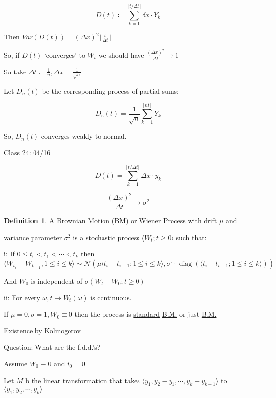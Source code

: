 \documentclass{article}
\theoremstyle{definition}
\newtheorem{definition}{Definition}
\begin{document}
\[
    D(t) \coloneqq \sum_{k=1}^{\lfloor t / \Delta t \rfloor} \delta x \cdot Y_k
\]

Then \(Var(D(t))=(\Delta x)^2 \lfloor \frac{t}{\Delta t} \rfloor\) 

So, if \(D(t)\) `converges' to \(W_t\) we should have \(\frac{(\Delta x)^2}{\Delta t} \to 1\) 

So take \(\Delta t \coloneqq \frac{1}{n}, \Delta x = \frac{1}{\sqrt{n} }\) 

Let \(D_n(t)\) be the corresponding process of partial sums:

\[
    D_n(t) = \frac{1}{\sqrt{n} } \sum_{k=1}^{\lfloor n t \rfloor} Y_k 
\]

So, \(D_n(t)\) converges weakly to normal.

\hrulefill

Class 24: 04/16

\[
    D(t) = \sum_{k=1}^{\lfloor t / \Delta t \rfloor} \Delta x\cdot y_k
\]

\[
    \frac{(\Delta x)^2}{\Delta t} \to \sigma ^2
\]

\begin{definition}
    A \underline{Brownian Motion} (BM) or \underline{Wiener Process} with \underline{drift} \(\mu\) and
    
    \underline{variance parameter} \(\sigma^2\) is a stochastic process \(\langle W_t; t\geq 0 \rangle \) such that:
    
    i: If \(0 \leq t_0 < t_1 < \cdots < t_k\) then \(\langle W_{t_i} - W_{t_{i-1}}, 1 \leq i \leq k \rangle \sim \mathcal{N}(\mu \langle t_i - t_{i-1}; 1 \leq i \leq k \rangle, \sigma^2 \cdot \operatorname{diag}(\langle t_i - t_{i-1}; 1 \leq i \leq k \rangle )  ) \)  

    And \(W_0\) is independent of \(\sigma(W_t - W_0; t\geq 0)\) 

    ii: For every \(\omega, t \mapsto W_t(\omega)\) is continuous.
    
    If \(\mu = 0, \sigma = 1, W_0 \equiv 0\) then the process is \underline{standard} \underline{B.M.} or just \underline{B.M.} 
\end{definition}

Existence by Kolmogorov

Question: What are the f.d.d.'s?

Assume \(W_0 \equiv 0\) and \(t_0 = 0\) 

Let \(M\) b the linear transformation that takes \(\langle y_1, y_2 - y_1, \cdots, y_k - y_{k-1} \rangle \) to \(\langle y_1, y_2,\cdots,y_k \rangle \)
\end{document}
